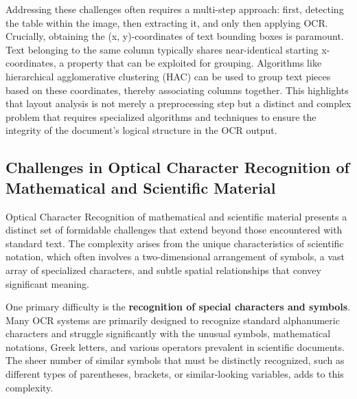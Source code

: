 Addressing these challenges often requires a multi-step approach: first, detecting the table within the image, then extracting it, and only then applying OCR. Crucially, obtaining the (x, y)-coordinates of text bounding boxes is paramount. Text belonging to the same column typically shares near-identical starting x-coordinates, a property that can be exploited for grouping. Algorithms like hierarchical agglomerative clustering (HAC) can be used to group text pieces based on these coordinates, thereby associating columns together. This highlights that layout analysis is not merely a preprocessing step but a distinct and complex problem that requires specialized algorithms and techniques to ensure the integrity of the document's logical structure in the OCR output.

\subsection{Challenges in Optical Character Recognition of Mathematical and Scientific Material}

Optical Character Recognition of mathematical and scientific material presents a distinct set of formidable challenges that extend beyond those encountered with standard text. The complexity arises from the unique characteristics of scientific notation, which often involves a two-dimensional arrangement of symbols, a vast array of specialized characters, and subtle spatial relationships that convey significant meaning.

One primary difficulty is the \textbf{recognition of special characters and symbols}. Many OCR systems are primarily designed to recognize standard alphanumeric characters and struggle significantly with the unusual symbols, mathematical notations, Greek letters, and various operators prevalent in scientific documents. The sheer number of similar symbols that must be distinctly recognized, such as different types of parentheses, brackets, or similar-looking variables, adds to this complexity.

